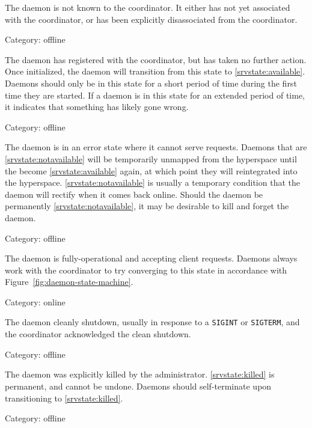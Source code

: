 \begin{description}[labelindent=\widthof{{\bf Not Available}},leftmargin=*,noitemsep,align=right]
\item[\namedlabel{srvstate:unknown}{Unknown}]
    The daemon is not known to the coordinator.  It either has not yet
    associated with the coordinator, or has been explicitly disassociated from
    the coordinator.

    Category: offline
\item[\namedlabel{srvstate:assigned}{Assigned}]
    The daemon has registered with the coordinator, but has taken no further
    action.  Once initialized, the daemon will transition from this state to
    \ref{srvstate:available}.  Daemons should only be in this state for a short
    period of time during the first time they are started.  If a daemon is in
    this state for an extended period of time, it indicates that something has
    likely gone wrong.

    Category: offline
\item[\namedlabel{srvstate:notavailable}{Not Available}]
    The daemon is in an error state where it cannot serve requests.  Daemons
    that are \ref{srvstate:notavailable} will be temporarily unmapped from the
    hyperspace until the become \ref{srvstate:available} again, at which point
    they will reintegrated into the hyperspace.  \ref{srvstate:notavailable} is
    usually a temporary condition that the daemon will rectify when it comes
    back online.  Should the daemon be permanently \ref{srvstate:notavailable},
    it may be desirable to kill and forget the daemon.

    Category: offline
\item[\namedlabel{srvstate:available}{Available}]
    The daemon is fully-operational and accepting client requests.  Daemons
    always work with the coordinator to try converging to this state in
    accordance with Figure~\ref{fig:daemon-state-machine}.

    Category: online
\item[\namedlabel{srvstate:shutdown}{Shutdown}]
    The daemon cleanly shutdown, usually in response to a \texttt{SIGINT} or
    \texttt{SIGTERM}, and the coordinator acknowledged the clean shutdown.

    Category: offline
\item[\namedlabel{srvstate:killed}{Killed}]
    The daemon was explicitly killed by the administrator.
    \ref{srvstate:killed} is permanent, and cannot be undone.  Daemons should
    self-terminate upon transitioning to \ref{srvstate:killed}.
    
    Category: offline
\end{description}

